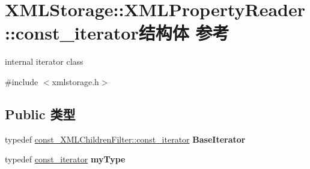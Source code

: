 \hypertarget{struct_x_m_l_storage_1_1_x_m_l_property_reader_1_1const__iterator}{}\section{X\+M\+L\+Storage\+:\+:X\+M\+L\+Property\+Reader\+:\+:const\+\_\+iterator结构体 参考}
\label{struct_x_m_l_storage_1_1_x_m_l_property_reader_1_1const__iterator}


internal iterator class  




{\ttfamily \#include $<$xmlstorage.\+h$>$}

\subsection*{Public 类型}
\begin{DoxyCompactItemize}
\item 
\mbox{\label{struct_x_m_l_storage_1_1_x_m_l_property_reader_1_1const__iterator_a69ae2114870c853f2af5a32733245b45}} 
typedef \hyperlink{struct_x_m_l_storage_1_1const___x_m_l_children_filter_1_1const__iterator}{const\+\_\+\+X\+M\+L\+Children\+Filter\+::const\+\_\+iterator} {\bfseries Base\+Iterator}
\item 
\mbox{\label{struct_x_m_l_storage_1_1_x_m_l_property_reader_1_1const__iterator_a56940ebe3884ad7a487e8bc2e71fb1bf}} 
typedef \hyperlink{struct_x_m_l_storage_1_1_x_m_l_property_reader_1_1const__iterator}{const\+\_\+iterator} {\bfseries my\+Type}
\end{DoxyCompactItemize}

